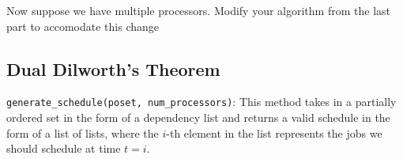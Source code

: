 \documentclass{article}
\begin{document}
    Now suppose we have multiple processors. Modify your algorithm from the last part to accomodate this change




    \subsection*{Dual Dilworth's Theorem}


    \begin{tcolorbox}[colback=yellow!40]
        \lstinline{generate_schedule(poset, num_processors)}:  This method takes in a partially ordered set in the form of a dependency list and returns a valid schedule in the form of a list of lists, where the $i$-th element in the list represents the jobs we should schedule at time $t = i$.
    \end{tcolorbox}






    
        

    

\end{document}
